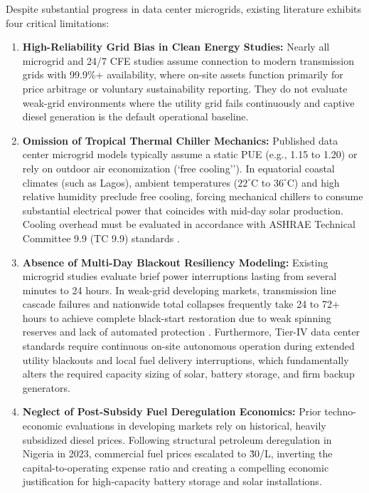 \documentclass[11pt,a4paper]{article}
\begin{document}
Despite substantial progress in data center microgrids, existing literature exhibits four critical limitations:
\begin{enumerate}
    \item \textbf{High-Reliability Grid Bias in Clean Energy Studies:} Nearly all microgrid and 24/7 CFE studies assume connection to modern transmission grids with 99.9\%+ availability, where on-site assets function primarily for price arbitrage or voluntary sustainability reporting. They do not evaluate weak-grid environments where the utility grid fails continuously and captive diesel generation is the default operational baseline.
    \item \textbf{Omission of Tropical Thermal Chiller Mechanics:} Published data center microgrid models typically assume a static PUE (e.g., 1.15 to 1.20) or rely on outdoor air economization (`free cooling''). In equatorial coastal climates (such as Lagos), ambient temperatures ($22^\circ\text{C}$ to $36^\circ\text{C}$) and high relative humidity preclude free cooling, forcing mechanical chillers to consume substantial electrical power that coincides with mid-day solar production. Cooling overhead must be evaluated in accordance with ASHRAE Technical Committee 9.9 (TC 9.9) standards \cite{ASHRAE2021}.
    \item \textbf{Absence of Multi-Day Blackout Resiliency Modeling:} Existing microgrid studies evaluate brief power interruptions lasting from several minutes to 24 hours. In weak-grid developing markets, transmission line cascade failures and nationwide total collapses frequently take 24 to 72+ hours to achieve complete black-start restoration due to weak spinning reserves and lack of automated protection \cite{Arowolo2022}. Furthermore, Tier-IV data center standards require continuous on-site autonomous operation during extended utility blackouts and local fuel delivery interruptions, which fundamentally alters the required capacity sizing of solar, battery storage, and firm backup generators.
    \item \textbf{Neglect of Post-Subsidy Fuel Deregulation Economics:} Prior techno-economic evaluations in developing markets rely on historical, heavily subsidized diesel prices. Following structural petroleum deregulation in Nigeria in 2023, commercial fuel prices escalated to \.30/L, inverting the capital-to-operating expense ratio and creating a compelling economic justification for high-capacity battery storage and solar installations.
\end{enumerate}
\end{document}
